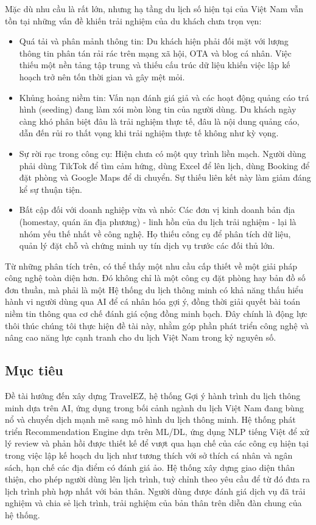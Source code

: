 Mặc dù nhu cầu là rất lớn, nhưng hạ tầng du lịch số hiện tại của Việt Nam vẫn tồn tại những vấn đề khiến trải nghiệm của du khách chưa trọn vẹn:

\begin{itemize}
    \item Quá tải và phân mảnh thông tin: Du khách hiện phải đối mặt với lượng thông tin phân tán rải rác trên mạng xã hội, OTA và blog cá nhân. Việc thiếu một nền tảng tập trung và thiếu cấu trúc dữ liệu khiến việc lập kế hoạch trở nên tốn thời gian và gây mệt mỏi.
    
    \item Khủng hoảng niềm tin: Vấn nạn đánh giá giả và các hoạt động quảng cáo trá hình (seeding) đang làm xói mòn lòng tin của người dùng. Du khách ngày càng khó phân biệt đâu là trải nghiệm thực tế, đâu là nội dung quảng cáo, dẫn đến rủi ro thất vọng khi trải nghiệm thực tế không như kỳ vọng.
    
    \item Sự rời rạc trong công cụ: Hiện chưa có một quy trình liền mạch. Người dùng phải dùng TikTok để tìm cảm hứng, dùng Excel để lên lịch, dùng Booking để đặt phòng và Google Maps để di chuyển. Sự thiếu liên kết này làm giảm đáng kể sự thuận tiện.
    
    \item Bất cập đối với doanh nghiệp vừa và nhỏ: Các đơn vị kinh doanh bản địa (homestay, quán ăn địa phương) - linh hồn của du lịch trải nghiệm - lại là nhóm yếu thế nhất về công nghệ. Họ thiếu công cụ để phân tích dữ liệu, quản lý đặt chỗ và chứng minh uy tín dịch vụ trước các đối thủ lớn.
\end{itemize}

Từ những phân tích trên, có thể thấy một nhu cầu cấp thiết về một giải pháp công nghệ toàn diện hơn. Đó không chỉ là một công cụ đặt phòng hay bản đồ số đơn thuần, mà phải là một Hệ thống du lịch thông minh có khả năng thấu hiểu hành vi người dùng qua AI để cá nhân hóa gợi ý, đồng thời giải quyết bài toán niềm tin thông qua cơ chế đánh giá cộng đồng minh bạch. Đây chính là động lực thôi thúc chúng tôi thực hiện đề tài này, nhằm góp phần phát triển công nghệ và nâng cao năng lực cạnh tranh cho du lịch Việt Nam trong kỷ nguyên số.

\subsection{Mục tiêu}
Đề tài hướng đến xây dựng TravelEZ, hệ thống Gợi ý hành trình du lịch thông minh dựa trên AI, ứng dụng trong bối cảnh ngành du lịch Việt Nam đang bùng nổ và chuyển dịch mạnh mẽ sang mô hình du lịch thông minh. Hệ thống phát triển Recommendation Engine dựa trên ML/DL, ứng dụng NLP tiếng Việt để xử lý review và phản hồi được thiết kế để vượt qua hạn chế của các công cụ hiện tại trong việc lập kế hoạch du lịch như tương thích với sở thích cá nhân và ngân sách, hạn chế các địa điểm có đánh giá ảo. Hệ thống xây dựng giao diện thân thiện, cho phép người dùng lên lịch trình, tuỳ chỉnh theo yêu cầu để từ đó đưa ra lịch trình phù hợp nhất với bản thân. Người dùng được đánh giá dịch vụ đã trải nghiệm và chia sẻ lịch trình, trải nghiệm của bản thân trên diễn đàn chung của hệ thống.

